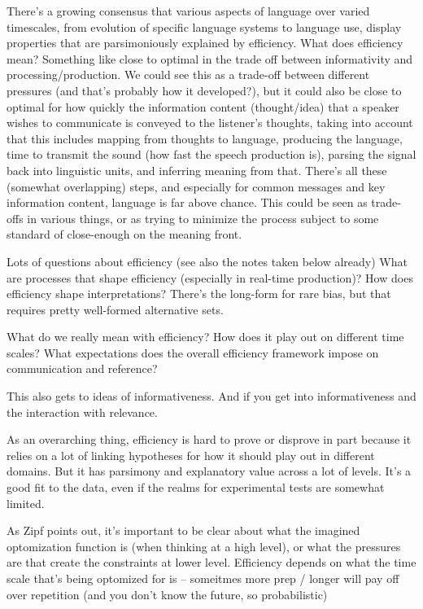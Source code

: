 \documentclass[]{article}
\begin{document}
There's a growing consensus that various aspects of language over varied timescales, from evolution of specific language systems to language use, display properties that are parsimoniously explained by efficiency. What does efficiency mean? Something like close to optimal in the trade off between informativity and processing/production. We could see this as a trade-off between different pressures (and that's probably how it developed?), but it could also be close to optimal for how quickly the information content (thought/idea) that a speaker wishes to communicate is conveyed to the listener's thoughts, taking into account that this includes mapping from thoughts to language, producing the language, time to transmit the sound (how fast the speech production is), parsing the signal back into linguistic units, and inferring meaning from that. There's all these (somewhat overlapping) steps, and especially for common messages and key information content, language is far above chance. This could be seen as trade-offs in various things, or as trying to minimize the process subject to some standard of close-enough on the meaning front. 


Lots of questions about efficiency (see also the notes taken below already)
What are processes that shape efficiency (especially in real-time production)? How does efficiency shape interpretations? There's the long-form for rare bias, but that requires pretty well-formed alternative sets. 

What do we really mean with efficiency? How does it play out on different time scales? What expectations does the overall efficiency framework impose on communication and reference? 

This also gets to ideas of informativeness. And if you get into informativeness and the interaction with relevance. 


As an overarching thing, efficiency is hard to prove or disprove in part because it relies on a lot of linking hypotheses for how it should play out in different domains. But it has parsimony and explanatory value across a lot of levels. It's a good fit to the data, even if the realms for experimental tests are somewhat limited. 

As Zipf points out, it's important to be clear about what the imagined optomization function is (when thinking at a high level), or what the pressures are that create the constraints at lower level. Efficiency depends on what the time scale that's being optomized for is -- someitmes more prep / longer will pay off over repetition (and you don't know the future, so probabilistic)
\end{document}
